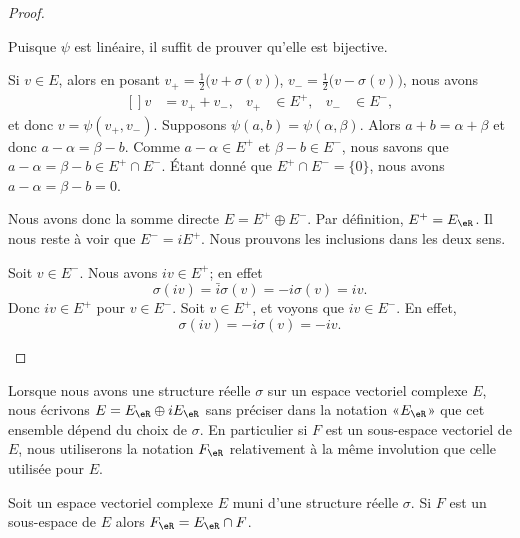 \begin{proof}
\begin{subproof}
		Puisque \( \psi\) est linéaire, il suffit de prouver qu'elle est bijective.
		\begin{subproof}
			\spitem[Surjectif]
			Si \( v\in E\), alors en posant \( v_+=\frac{ 1 }{2}\big( v+\sigma(v) \big)\), \( v_-=\frac{ 1 }{2}\big( v-\sigma(v) \big)\), nous avons
			\begin{equation}
				\begin{aligned}[]
					v & =v_+ + v_-, & v_+ & \in E^+, & v_- & \in E^-,
				\end{aligned}
			\end{equation}
			et donc \( v=\psi(v_+,v_-)\).
			\spitem[Injectif]
			Supposons \( \psi(a,b)=\psi(\alpha,\beta)\). Alors \( a+b=\alpha+\beta\) et donc \( a-\alpha=\beta-b\). Comme \( a-\alpha\in E^+\)  et \( \beta-b\in E^- \), nous savons que \( a-\alpha=\beta-b\in E^+\cap E^-\). Étant donné que \( E^+\cap E^-=\{ 0 \}\), nous avons \( a-\alpha=\beta-b=0\).
		\end{subproof}
		Nous avons donc la somme directe \( E=E^+\oplus E^-\).
		\spitem[Conclusion]
		Par définition, \( E^+=E_{\eR}\). Il nous reste à voir que \( E^-=iE^+\). Nous prouvons les inclusions dans les deux sens.
		\begin{subproof}
			\spitem[\( E^-\subset iE^+\)]
			Soit \( v\in E^-\). Nous avons \( iv\in E^+\); en effet
			\begin{equation}
				\sigma(iv)=\bar i\sigma(v)=-i\sigma(v)=iv.
			\end{equation}
			Donc \( iv\in E^+\) pour \( v\in E^-\).
			\spitem[\( iE^+\subset E^-\)]
			Soit \( v\in E^+\), et voyons que \( iv\in E^-\). En effet,
			\begin{equation}
				\sigma(iv)=-i\sigma(v)=-iv.
			\end{equation}
		\end{subproof}
	\end{subproof}
\end{proof}

\begin{normaltext}
	Lorsque nous avons une structure réelle \( \sigma\) sur un espace vectoriel complexe \( E\), nous écrivons \( E=E_{\eR}\oplus iE_{\eR}\) sans préciser dans la notation «\( E_{\eR}\)» que cet ensemble dépend du choix de \( \sigma\). En particulier si \( F\) est un sous-espace vectoriel de \( E\), nous utiliserons la notation \( F_{\eR}\) relativement à la même involution que celle utilisée pour \( E\).
\end{normaltext}

\begin{lemma}
	Soit un espace vectoriel complexe \( E\) muni d'une structure réelle \( \sigma\). Si \( F\) est un sous-espace de \( E\) alors \( F_{\eR}=E_{\eR}\cap F\).
\end{lemma}


